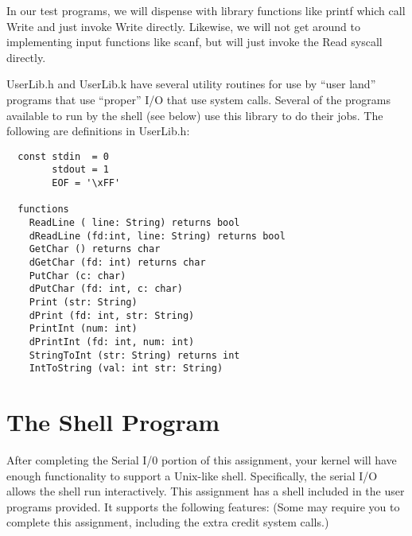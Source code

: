 \documentclass[11pt]{article}
\begin{document}
In our test programs, we will dispense with library functions like
printf which call Write and just invoke Write directly.  Likewise, we
will not get around to implementing input functions like scanf, but
will just invoke the Read syscall directly.

UserLib.h and UserLib.k have several utility routines for use by ``user
land'' programs that use ``proper'' I/O that use system calls.  Several
of the programs available to run by the shell (see below) use this
library to do their jobs.  The following are definitions in UserLib.h:

\begin{verbatim}
  const stdin  = 0
        stdout = 1
        EOF = '\xFF'

  functions
    ReadLine ( line: String) returns bool
    dReadLine (fd:int, line: String) returns bool
    GetChar () returns char
    dGetChar (fd: int) returns char
    PutChar (c: char)
    dPutChar (fd: int, c: char)
    Print (str: String)
    dPrint (fd: int, str: String)
    PrintInt (num: int)
    dPrintInt (fd: int, num: int)
    StringToInt (str: String) returns int
    IntToString (val: int str: String)
\end{verbatim}

\section{The Shell Program}

After completing the Serial I/0 portion of this assignment, your
kernel will have enough functionality to support a Unix-like shell.
Specifically, the serial I/O allows the shell run interactively.
This assignment has a shell included in the user programs provided.
It supports the following features:  (Some may require you to
complete this assignment, including the extra credit system
calls.)
\end{document}
